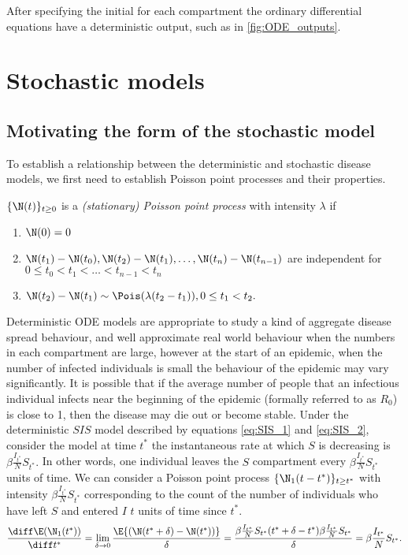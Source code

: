 After specifying the initial for each compartment the ordinary differential equations have a deterministic output, such as in \ref{fig:ODE_outputs}.

\section{Stochastic models}

\subsection*{Motivating the form of the stochastic model}

To establish a relationship between the deterministic and stochastic disease models, we first need to establish Poisson point processes and their properties.

\begin{definition}\label{def:ppp}
    $\{\N(t)\}_{t\geq0}$ is a \emph{(stationary) Poisson point process} with intensity $\lambda$ if \begin{enumerate}
        \item $\N(0) = 0$
        \item $\N(t_1) - \N(t_0), \N(t_2) - \N(t_1), \dots, \N(t_n) - \N(t_{n-1})$ are independent for $0 \leq t_0 < t_1 < \dots < t_{n-1} < t_n $
        \item $\N(t_2) - \N(t_1) \sim \Pois(\lambda(t_2 - t_1)), 0 \leq t_1 < t_2.$
    \end{enumerate}
\end{definition}

Deterministic ODE models are appropriate to study a kind of aggregate disease spread behaviour, and well approximate real world behaviour when the numbers in each compartment are large, however at the start of an epidemic, when the number of infected individuals is small the behaviour of the epidemic may vary significantly. It is possible that if the average number of people that an infectious individual infects near the beginning of the epidemic (formally referred to as $R_0$) is close to 1, then the disease may die out or become stable. Under the deterministic $SIS$ model described by equations \ref{eq:SIS_1} and \ref{eq:SIS_2}, consider the model at time $t^*$ the instantaneous rate at which $S$ is decreasing is $\beta \frac{I_{t^*}}{N} S_{t^*}.$ In other words, one individual leaves the $S$ compartment every $\beta \frac{I_{t^*}}{N} S_{t^*}$ units of time. We can consider a Poisson point process $\{\N_1(t - t^*)\}_{t\geq t^*}$ with intensity $\beta \frac{I_{t^*}}{N} S_{t^*}$ corresponding to the count of the number of individuals who have left $S$ and entered $I$ $t$ units of time since $t^*.$ $$\frac{\diff \E(\N_1(t^*))}{\diff t^*} = \lim_{\delta \to 0}\frac{\E{(\N(t^* + \delta) - \N(t^*))}}{\delta} = \frac{\beta \frac{I_{t^*}}{N} S_{t^*}(t^* + \delta - t^*)\beta \frac{I_{t^*}}{N} S_{t^*}}{\delta} = \beta \frac{I_{t^*}}{N} S_{t^*}.$$

